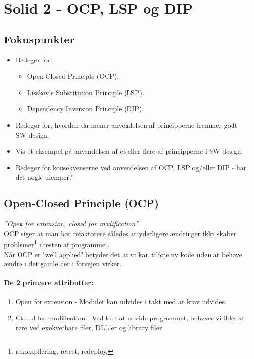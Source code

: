 \section{Solid 2 - OCP, LSP og DIP}

\subsection{Fokuspunkter}

\begin{itemize}
	\item Redegør for:
	\begin{itemize}
		\item Open-Closed Principle (OCP).
		\item Lisskov's Substitution Principle (LSP).
		\item Dependency Inversion Principle (DIP).
	\end{itemize}
	\item Redegør for, hvordan du mener anvendelsen af principperne fremmer godt SW design.
	\item Vis et eksempel på anvendelsen af et eller flere af principperne i SW design.
	\item Redegør for konsekvenserne ved anvendelsen af OCP, LSP og/eller DIP - har det nogle ulemper?
\end{itemize}

\subsection{Open-Closed Principle (OCP)}\label{sec:ocp}
\textit{''Open for extension, closed for modification''}\\

OCP siger at man bør refaktorere således at yderligere ændringer ikke skaber problemer\footnote{rekompilering, retest, redeploy.} i resten af programmet.\\

Når OCP er "well applied" betyder det at vi kan tilføje ny kode uden at behøve ændre i det gamle der i forvejen virker.

\paragraph{De 2 primære attributter:}
\begin{enumerate}
	\item Open for extension - Modulet kan udvides i takt med at krav udvides.
	\item Closed for modification - Ved kun at udvide programmet, behøves vi ikka at røre ved exekverbare filer, DLL'er og library filer.
\end{enumerate}

